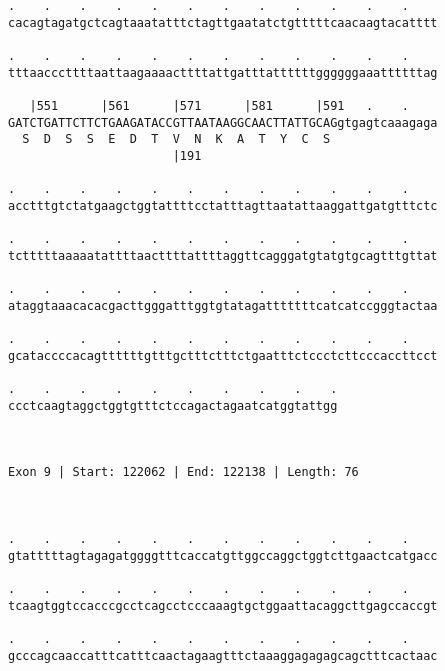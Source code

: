 \documentclass{article}
\begin{document}
\begin{Verbatim}
.    .    .    .    .    .    .    .    .    .    .    .    
cacagtagatgctcagtaaatatttctagttgaatatctgtttttcaacaagtacatttt
                                                            
.    .    .    .    .    .    .    .    .    .    .    .    
tttaacccttttaattaagaaaacttttattgatttattttttggggggaaattttttag
                                                            
   |551      |561      |571      |581      |591   .    .    
GATCTGATTCTTCTGAAGATACCGTTAATAAGGCAACTTATTGCAGgtgagtcaaagaga
  S  D  S  S  E  D  T  V  N  K  A  T  Y  C  S               
                       |191                                 
  
.    .    .    .    .    .    .    .    .    .    .    .    
acctttgtctatgaagctggtattttcctatttagttaatattaaggattgatgtttctc
                                                            
.    .    .    .    .    .    .    .    .    .    .    .    
tctttttaaaaatattttaacttttattttaggttcagggatgtatgtgcagtttgttat
                                                            
.    .    .    .    .    .    .    .    .    .    .    .    
ataggtaaacacacgacttgggatttggtgtatagatttttttcatcatccgggtactaa
                                                            
.    .    .    .    .    .    .    .    .    .    .    .    
gcataccccacagttttttgtttgctttctttctgaatttctccctcttcccaccttcct
                                                            
.    .    .    .    .    .    .    .    .    .
ccctcaagtaggctggtgtttctccagactagaatcatggtattgg
                                              
                                              
 
Exon 9 | Start: 122062 | End: 122138 | Length: 76



.    .    .    .    .    .    .    .    .    .    .    .    
gtatttttagtagagatggggtttcaccatgttggccaggctggtcttgaactcatgacc
                                                            
.    .    .    .    .    .    .    .    .    .    .    .    
tcaagtggtccacccgcctcagcctcccaaagtgctggaattacaggcttgagccaccgt
                                                            
.    .    .    .    .    .    .    .    .    .    .    .    
gcccagcaaccatttcatttcaactagaagtttctaaaggagagagcagctttcactaac
                                                            

\end{Verbatim}
\end{document}
